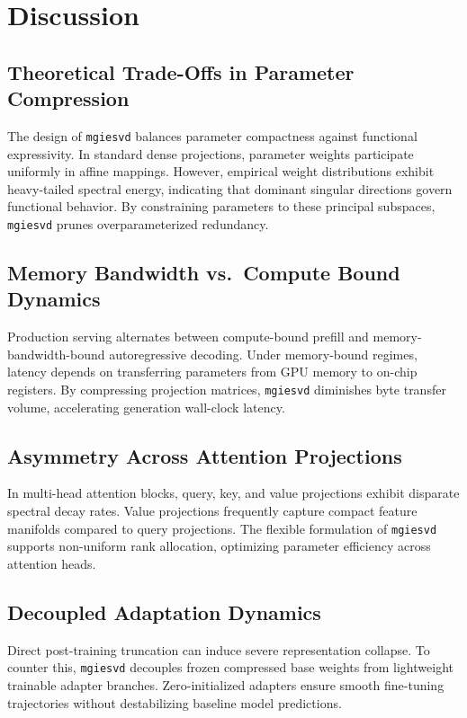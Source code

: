 \section{Discussion}

\subsection{Theoretical Trade-Offs in Parameter Compression}
The design of \texttt{mgiesvd} balances parameter compactness against functional expressivity. In standard dense projections, parameter weights participate uniformly in affine mappings. However, empirical weight distributions exhibit heavy-tailed spectral energy, indicating that dominant singular directions govern functional behavior. By constraining parameters to these principal subspaces, \texttt{mgiesvd} prunes overparameterized redundancy.

\subsection{Memory Bandwidth vs.\ Compute Bound Dynamics}
Production serving alternates between compute-bound prefill and memory-bandwidth-bound autoregressive decoding. Under memory-bound regimes, latency depends on transferring parameters from GPU memory to on-chip registers. By compressing projection matrices, \texttt{mgiesvd} diminishes byte transfer volume, accelerating generation wall-clock latency.

\subsection{Asymmetry Across Attention Projections}
In multi-head attention blocks, query, key, and value projections exhibit disparate spectral decay rates. Value projections frequently capture compact feature manifolds compared to query projections. The flexible formulation of \texttt{mgiesvd} supports non-uniform rank allocation, optimizing parameter efficiency across attention heads.

\subsection{Decoupled Adaptation Dynamics}
Direct post-training truncation can induce severe representation collapse. To counter this, \texttt{mgiesvd} decouples frozen compressed base weights from lightweight trainable adapter branches. Zero-initialized adapters ensure smooth fine-tuning trajectories without destabilizing baseline model predictions.

